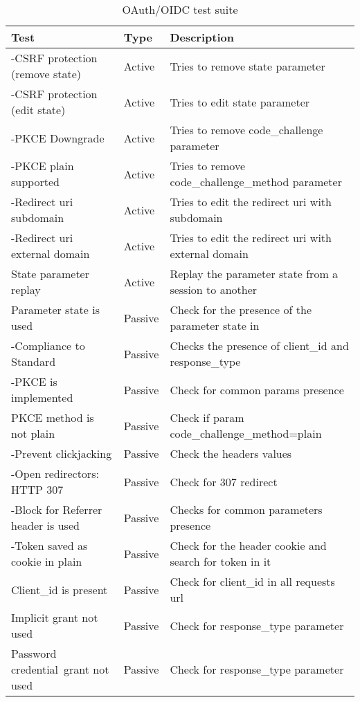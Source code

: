 \begin{table}[h]
    \begin{tabular}{|l|l|l|}
        \hline
        Test                                   & Type         & Description                             \\
        \hline\hline
        -CSRF protection (remove state)          & Active        & Tries to remove state parameter \\
        -CSRF protection (edit state)    &   Active  &   Tries to edit state parameter\\
        -PKCE Downgrade                  &   Active  &   Tries to remove code\_challenge parameter \\
        -PKCE plain supported            &   Active  &   Tries to remove code\_challenge\_method parameter \\
        -Redirect uri subdomain          &   Active  &   Tries to edit the redirect uri with subdomain \\
        -Redirect uri external domain    &   Active  &   Tries to edit the redirect uri with external domain \\
        State parameter replay          &   Active  &   Replay the parameter state from a session to another \\
        Parameter state is used         &   Passive  &   Check for the presence of the parameter state in \\
        -Compliance to Standard          &   Passive  &   Checks the presence of client\_id and response\_type\\
        -PKCE is implemented             &   Passive &   Check for common params presence \\
        PKCE method is not plain        &   Passive &   Check if param code\_challenge\_method=plain \\
        -Prevent clickjacking            &   Passive &   Check the headers values \\
        -Open redirectors: HTTP 307      &   Passive &   Check for 307 redirect \\
        -Block for Referrer header is used  &    Passive &   Checks for common parameters presence \\
        -Token saved as cookie in plain  &   Passive &   Check for the header cookie and search for token in it\\
        Client\_id is present            &   Passive &   Check for client\_id in all requests url \\
        Implicit grant not used         &   Passive &   Check for response\_type parameter \\ 
        Password credential\ grant not used  &   Passive &   Check for response\_type parameter \\

        \hline
    \end{tabular}
    \caption{\label{tab:OAuth_test_suite}OAuth/OIDC test suite}
\end{table}

